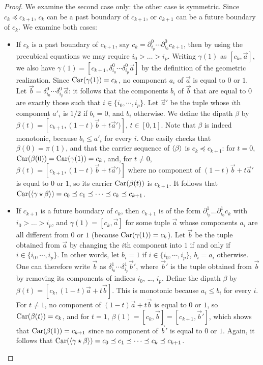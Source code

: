 \begin{proof}
  We examine the second case only: the other case is symmetric.  Since
  $c_k \preceq c_{k+1}$, $c_k$ can be a past boundary of $c_{k+1}$, or
  $c_{k+1}$ can be a future boundary of $c_k$.  We examine both cases:
  \begin{itemize}
  \item If $c_k$ is a past boundary of $c_{k+1}$, say $c_k
    = \partial_{i_p}^0\cdots\partial_{i_0}^0 c_{k+1}$, then by using
    the precubical equations we may require $i_0 > \ldots > i_p$.
    Writing $\gamma(1)$ as $[c_k, \vec a]$, we also have $\gamma (1) =
    [c_{k+1}, \delta_{i_0}^0 \cdots \delta_{i_p}^0 \vec a]$ by the
    definition of the geometric realization.  Since $\text{Car}(\gamma
    (1)) = c_k$, no component $a_i$ of $\vec a$ is equal to $0$ or
    $1$.  Let $\vec b = \delta_{i_0}^0 \cdots \delta_{i_p}^0 \vec a$:
    it follows that the components $b_i$ of $\vec b$ that are equal to
    $0$ are exactly those such that $i\in\{i_0,\cdots,i_p\}$.  Let
    $\vec a'$ be the tuple whose $i$th component $a'_i$ is $1/2$ if
    $b_i=0$, and $b_i$ otherwise.  We define the dipath $\beta$ by
    $\beta (t) = [c_{k+1},(1-t) \vec b +t \vec a')]$, $t \in [0, 1]$.
    Note that $\beta$ is indeed monotonic, because $b_i \leq a'_i$ for
    every $i$.  One easily checks that $\beta (0) = \pi (1)$, and that
    the carrier sequence of $\langle\beta\rangle$ is $c_k \preceq
    c_{k+1}$: for $t=0$, $\text{Car}(\beta (0)) = \text{Car}(\gamma (1))
    = c_k$, and, for $t \neq 0$, $\beta (t) = [c_{k+1},(1-t) \vec b +t
    \vec a')]$ where no component of $(1-t) \vec b +t \vec a'$ is
    equal to $0$ or $1$, so its carrier $\text{Car} (\beta (t))$ is
    $c_{k+1}$.  It follows that
    $\text{Car}(\langle\gamma\star\beta\rangle) = c_0 \preceq c_1
    \preceq \cdots \preceq c_k \preceq c_{k+1}$.
  \item If $c_{k+1}$ is a future boundary of $c_k$, then $c_{k+1}$ is
    of the form $\partial_{i_p}^1\ldots\partial_{i_0}^1 c_k$ with $i_0
    > \ldots > i_p$, and $\gamma (1) = [c_k, \vec a]$ for some tuple
    $\vec a$ whose components $a_i$ are all different from $0$ or $1$
    (because $\text{Car}(\gamma (1)) = c_k$).  Let $\vec b$ be the tuple
    obtained from $\vec a$ by changing the $i$th component into $1$
    if and only if $i \in \{i_0, \cdots, i_p\}$.  In other words, let
    $b_i = 1$ if $i \in \{i_0, \cdots, i_p\}$, $b_i=a_i$ otherwise.
    One can therefore write $\vec b$ as $\delta_{i_0}^1 \cdots
    \delta_{i_p}^1 \vec b'$, where $\vec b'$ is the tuple obtained
    from $\vec b$ by removing its components of indices $i_0$, \ldots,
    $i_p$.  Define the dipath $\beta$ by $\beta (t) = [c_k, (1-t) \vec
    a + t \vec b]$.  This is monotonic because $a_i \leq b_i$ for
    every $i$.  For $t \neq 1$, no component of $(1-t) \vec a + t \vec
    b$ is equal to $0$ or $1$, so $\text{Car}(\beta (t))=c_k$, and
    for $t=1$, $\beta (1) = [c_k, \vec b] = [c_{k+1}, \vec b']$, which
    shows that $\text{Car}(\beta (1)) = c_{k+1}$ since no component
    of $\vec b'$ is equal to $0$ or $1$.  Again, it follows that
    $\text{Car}(\langle\gamma\star\beta\rangle) = c_0 \preceq c_1
    \preceq \cdots \preceq c_k \preceq c_{k+1}$. 
  \end{itemize}
\end{proof}
